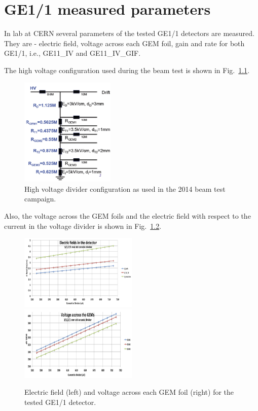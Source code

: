 \chapter{GE1/1 measured parameters} %
\label{cha:ge1_1_measured_parameters}
In lab at CERN several parameters of the tested GE1/1 detectors are measured.
They are - electric field, voltage across each GEM foil, gain and rate for both GE1/1, i.e., GE11\_IV and GE11\_IV\_GIF.

The high voltage configuration used during the beam test is shown in Fig.~\ref{fig:HV_configuration}. 
\begin{figure}[htbp]
    \centering
    \includegraphics[width=0.40\textwidth]{figures/GEM/HV_divider_gem_testbeam_2014.jpeg}
    \caption{High voltage divider configuration as used in the 2014 beam test campaign.}
    \label{fig:HV_configuration}
\end{figure}


Also, the voltage across the GEM foils and  the electric field  with respect to the current in the voltage divider is shown in Fig.~\ref{fig:GEM_voltage_electricfield}. 
\begin{figure}[htbp]
    \centering
    \includegraphics[width=0.5\textwidth]{figures/GEM/GE11_IV_ElectricField_detector.jpeg}%
    \includegraphics[width=0.5\textwidth]{figures/GEM/GE11_IV_VoltageAcross_GEM.jpeg}
    \caption{Electric field (left) and voltage across each GEM foil (right) for the tested GE1/1 detector.}
    \label{fig:GEM_voltage_electricfield}
\end{figure}


